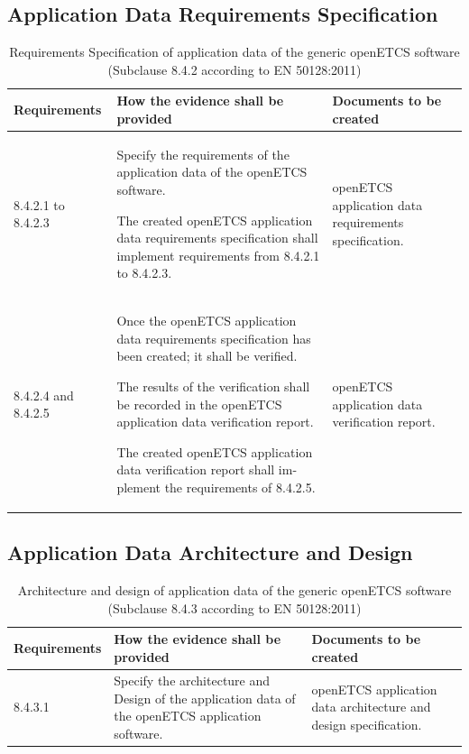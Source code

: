 \documentclass{template/openetcs_report}
\begin{document}
\subsection{Application Data Requirements Specification}
{\footnotesize\sffamily\centering
\begin{longtable}{|p{2cm}|p{9cm}|p{3cm}|}
\caption{Requirements Specification of application data of the generic openETCS software (Subclause 8.4.2 according to EN 50128:2011)}\\
\hline
\bfseries Requirements & \bfseries How the evidence shall be provided & \bfseries Documents to be created\\
\hline
\hline
\endhead
\hline
\endfoot

8.4.2.1 to 8.4.2.3 & Specify the requirements of the  application data of the openETCS software.

The created openETCS application data requirements specification shall implement requirements from 8.4.2.1 to 8.4.2.3.
& openETCS application data requirements specification.\\ 
\hline
8.4.2.4 and 8.4.2.5 & Once the openETCS application data requirements specification has been created; it shall be verified.

The results of the verification shall be recorded in the openETCS application data verification report.

The created openETCS application data verification report shall im-plement the requirements of 8.4.2.5.
& openETCS application data verification report.\\ 
\hline
\end{longtable}}


\subsection{Application Data Architecture and Design}
{\footnotesize\sffamily\centering
\begin{longtable}{|p{2cm}|p{9cm}|p{3cm}|}
\caption{Architecture and design of application data of the generic openETCS software (Subclause 8.4.3 according to EN 50128:2011)}\\
\hline
\bfseries Requirements & \bfseries How the evidence shall be provided & \bfseries Documents to be created\\
\hline
\hline
\endhead
\hline
\endfoot

8.4.3.1  & Specify the architecture and Design of the application data of the openETCS application software.
& openETCS application data architecture and design specification.\\ 
\hline
\end{longtable}}
\end{document}
